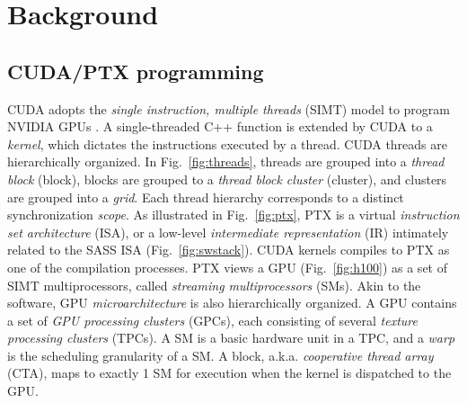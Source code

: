 \documentclass[acmsmall]{acmart}
\begin{document}
\section{Background}
\label{sec:bg}

\subsection{CUDA/PTX programming}

CUDA adopts the \textit{single instruction, multiple threads} (SIMT) model to program NVIDIA GPUs \cite{cuda}. A single-threaded C++ function is extended by CUDA to a \textit{kernel}, which dictates the instructions executed by a thread. CUDA threads are hierarchically organized. In Fig.~\ref{fig:threads}, threads are grouped into a \textit{thread block} (block), blocks are grouped to a \textit{thread block cluster} (cluster), and clusters are grouped into a \textit{grid}. Each thread hierarchy corresponds to a distinct synchronization \textit{scope}.
As illustrated in Fig.~\ref{fig:ptx}, PTX is a virtual \textit{instruction set architecture} (ISA), or a low-level \textit{intermediate representation} (IR) intimately related to the SASS ISA (Fig.~\ref{fig:swstack}). CUDA kernels compiles to PTX as one of the compilation processes.
PTX views a GPU (Fig.~\ref{fig:h100}) as a set of SIMT multiprocessors, called \textit{streaming multiprocessors} (SMs). Akin to the software, GPU \textit{microarchitecture} is also hierarchically organized. A GPU contains a set of \textit{GPU processing clusters} (GPCs), each consisting of several \textit{texture processing clusters} (TPCs). A SM is a basic hardware unit in a TPC, and a \textit{warp} is the scheduling granularity of a SM.
A block, a.k.a. \textit{cooperative thread array} (CTA), maps to exactly 1 SM for execution when the kernel is dispatched to the GPU.
\end{document}
